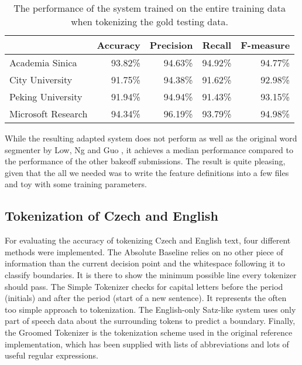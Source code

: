 \begin{table}
  \begin{center}
    \begin{tabular}{ | l | r | r | r | r | }
      \hline
      & Accuracy & Precision & Recall & F-measure \\ \hline
      Academia Sinica & 93.82\% & 94.63\% & 94.92\% & 94.77\% \\ \hline
      City University & 91.75\% & 94.38\% & 91.62\% & 92.98\% \\ \hline
      Peking University & 91.94\% & 94.94\% & 91.43\% & 93.15\% \\ \hline
      Microsoft Research & 94.34\% & 96.19\% & 93.79\% & 94.98\% \\
      \hline
    \end{tabular}
  \end{center}
  \caption[Final performance of Chinese segmenter]{The performance of the system trained on the entire training data
           when tokenizing the gold testing data.}
  \label{tbl:bakeoff-final}
\end{table}

While the resulting adapted system does not perform as well as the original
word segmenter by Low, Ng and Guo \cite{seg-chinese-maxent}, it achieves a
median performance compared to the performance of the other bakeoff
submissions. The result is quite pleasing, given that the all we needed was to
write the feature definitions into a few files and toy with some training
parameters.

\subsection{Tokenization of Czech and English}
\label{ssec:eval-acc-eng}

For evaluating the accuracy of tokenizing Czech and English text, four
different methods were implemented. The Absolute Baseline relies on no other
piece of information than the current decision point and the whitespace
following it to classify boundaries. It is there to show the minimum possible
line every tokenizer should pass. The Simple Tokenizer checks for capital
letters before the period (initials) and after the period (start of a new
sentence). It represents the often too simple approach to tokenization. The
English-only Satz-like \cite{sbd-satz} system uses only part of speech data
about the surrounding tokens to predict a boundary. Finally, the Groomed
Tokenizer is the tokenization scheme used in the original reference
implementation, which has been supplied with lists of abbreviations and lots of
useful regular expressions.

